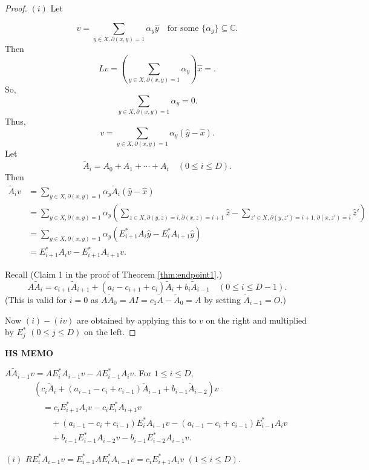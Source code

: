\documentclass[
]{book}
\theoremstyle{definition}
\theoremstyle{definition}
\theoremstyle{definition}
\theoremstyle{definition}
\theoremstyle{remark}
\begin{document}
\begin{proof}
\leavevmode

\((i)\) Let

\[v = \sum_{y\in X, \partial(x,y)=1}\alpha_y \hat{y} \quad \text{for some }\{\alpha_g\}\subseteq \mathbb{C}.\]
Then
\[Lv = \left(\sum_{y\in X, \partial(x,y)=1}\alpha_y\right)\hat{x} = .\]
So,
\[\sum_{y\in X, \partial(x,y)=1}\alpha_y = 0.\]
Thus,
\[v = \sum_{y\in X, \partial(x,y)=1}\alpha_y(\hat{y}-\hat{x}).\]
Let
\[\tilde{A}_i = A_0 + A_1 + \cdots + A_i \quad (0\leq i\leq D).\]
Then
\begin{align}
\tilde{A}_iv & = \sum_{y\in X, \partial(x,y)=1}\alpha_y \tilde{A}_i(\hat{y}-\hat{x})\\
& = \sum_{y\in X, \partial(x,y)=1}\alpha_y\left(\sum_{z\in X, \partial(y,z)=i, \partial(x,z)=i+1}\hat{z}-\sum_{z'\in X, \partial(y,z')=i+1, \partial(x,z')=i}\hat{z}'\right)\\
& = \sum_{y\in X, \partial(x,y)=1}\alpha_y(E^*_{i+1}A_i\hat{y}- E^*_iA_{i+1}\hat{y})\\
& = E^*_{i+1}A_iv - E^*_{i+1}A_{i+1}v.
\end{align}

Recall (Claim 1 in the proof of Theorem \ref{thm:endpoint1}.)
\[A\tilde{A}_i = c_{i+1}\tilde{A}_{i+1}+ (a_i-c_{i+1}+c_i)\tilde{A}_i + b_i\tilde{A}_{i-1}\quad (0\leq i\leq D-1).\]
(This is valid for \(i=0\) as \(A\tilde{A}_0 = AI = c_1\tilde{A}- \tilde{A}_0 = A\) by setting \(\tilde{A}_{i-1} = O\).)

Now \((i)-(iv)\) are obtained by applying this to \(v\) on the right and multiplied by \(E^*_j\) \((0\leq j\leq D)\) on the left.

\end{proof}

\textbf{HS MEMO}

\(A\tilde{A}_{i-1}v = AE^*_iA_{i-1}v - AE^*_{i-1}A_iv\). For \(1\leq i\leq D\),
\begin{align}
& (c_i\tilde{A}_i + (a_{i-1}-c_i+c_{i-1})\tilde{A}_{i-1}+b_{i-1}\tilde{A}_{i-2})v\\
& \quad = c_i E^*_{i+1}A_iv - c_iE^*_iA_{i+1}v\\
& \qquad + (a_{i-1}-c_i+c_{i-1})E^*_iA_{i-1}v - (a_{i-1}-c_i+c_{i-1})E^*_{i-1}A_iv\\
& \qquad + b_{i-1}E^*_{i-1}A_{i-2}v - b_{i-1}E^*_{i-2}A_{i-1}v.
\end{align}

\((i)\) \(RE^*_iA_{i-1}v = E^*_{i+1}AE^*_iA_{i-1}v = c_iE^*_{i+1}A_iv\) \((1\leq i\leq D)\).
\end{document}
